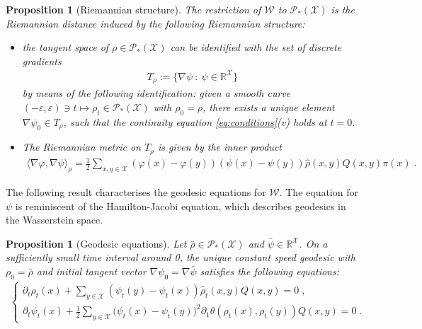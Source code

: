 \documentclass[a4paper,11pt,reqno]{amsart}
\theoremstyle{plain}
\newtheorem{proposition}[theorem]{Proposition}
\theoremstyle{remark}
\numberwithin{equation}{section}
\begin{document}
\begin{proposition}[Riemannian structure]\label{prop:riem-properties}
The restriction of ${\mathcal{W}}$ to ${{\mathscr{P}}_*({\mathcal{X}})}$ is the Riemannian
  distance induced by the following Riemannian structure:
\begin{itemize}
\item[-] the tangent space of $\rho \in {{\mathscr{P}}_*({\mathcal{X}})}$ can be identified
  with the set of discrete gradients
\begin{align*}
 T_\rho := \{ \nabla \psi \ : \ \psi \in {{\mathbb R}}^{\mathcal{X}} \}
\end{align*}
by means of the following identification: given a smooth curve
$(-{\varepsilon}, {\varepsilon}) \ni t \mapsto \rho_t \in {{\mathscr{P}}_*({\mathcal{X}})}$ with $\rho_0 = \rho$,
there exists a unique element $\nabla \psi_0 \in T_\rho$, such that
the continuity equation \eqref{eq:conditions}(v) holds at $t = 0$.
\item[-] The Riemannian metric on $T_\rho$ is given by the inner product
\begin{align*}
 {\langle {{\nabla {\varphi}, \nabla \psi}}\rangle}_\rho 
   = \frac12 \sum_{x,y\in {\mathcal{X}}} 
 ({\varphi}(x) - {\varphi}(y))(\psi(x) - \psi(y)) {\hat\rho}(x,y)Q(x,y) \pi(x)\;.   
\end{align*}
\end{itemize}
\end{proposition}

The following result characterises the geodesic equations for
${\mathcal{W}}$. The equation for $\psi$ is reminiscent of the Hamilton-Jacobi
equation, which describes geodesics in the Wasserstein space.

\begin{proposition}[Geodesic equations]\label{prop:geod}
Let $\bar\rho \in {{\mathscr{P}}_*({\mathcal{X}})}$ and $\bar\psi \in {{\mathbb R}}^{\mathcal{X}}$. On a
sufficiently small time interval around 0, the unique constant speed
geodesic with $\rho_0 = \bar\rho$ and initial tangent vector 
$\nabla \psi_0 = \nabla\bar\psi$ satisfies the following equations:
\begin{equation}\begin{aligned} \label{eq:geod-equs}
\begin{cases}
\partial_t \rho_t(x) + 
   \displaystyle\sum_{y \in {\mathcal{X}}}  ( \psi_t(y) - \psi_t(x) ) {\hat\rho}_t(x,y) Q(x,y)  = 0 \;,\\
 \partial_t \psi_t(x)  + \displaystyle\frac12
     \displaystyle\sum_{y \in {\mathcal{X}}} \big(  \psi_t(x) -\psi_t(y) \big)^2 
     		 \partial_1\theta(\rho_t(x), \rho_t(y))  Q(x,y) = 0 \;.
\end{cases}
\end{aligned}\end{equation}
\end{proposition}
\end{document}
